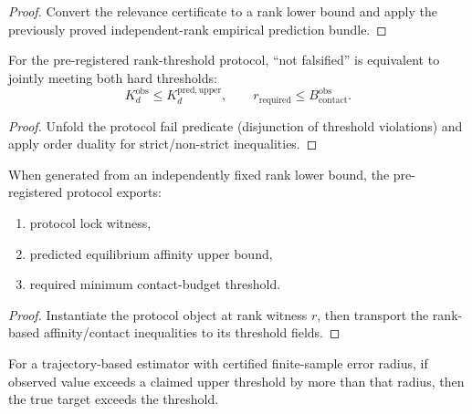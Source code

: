 \begin{proof}
Convert the relevance certificate to a rank lower bound and apply the previously proved independent-rank empirical prediction bundle.
\end{proof}

\begin{theorem}\label{thm:md-falsification-not-falsified-iff}
For the pre-registered rank-threshold protocol, ``not falsified'' is equivalent to jointly meeting both hard thresholds:
\[
K_d^{\mathrm{obs}} \le K_d^{\mathrm{pred,upper}},\qquad
r_{\mathrm{required}} \le B_{\mathrm{contact}}^{\mathrm{obs}}.
\]
\end{theorem}

\begin{proof}
Unfold the protocol fail predicate (disjunction of threshold violations) and apply order duality for strict/non-strict inequalities.
\end{proof}

\begin{theorem}\label{thm:md-preregistered-rank-protocol-soundness}
When generated from an independently fixed rank lower bound, the pre-registered protocol exports:
\begin{enumerate}
\item protocol lock witness,
\item predicted equilibrium affinity upper bound,
\item required minimum contact-budget threshold.
\end{enumerate}
\end{theorem}

\begin{proof}
Instantiate the protocol object at rank witness \(r\), then transport the rank-based affinity/contact inequalities to its threshold fields.
\end{proof}

\begin{theorem}\label{thm:finite-sample-upper-violation-implies-true-violation}
For a trajectory-based estimator with certified finite-sample error radius, if observed value exceeds a claimed upper threshold by more than that radius, then the true target exceeds the threshold.
\end{theorem}

